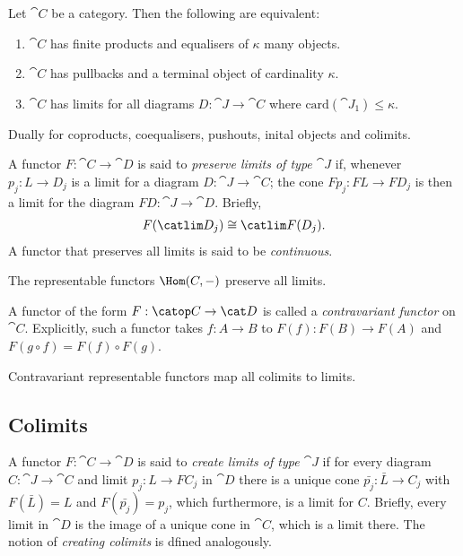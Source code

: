 \documentclass{article}
\begin{document}
\begin{proposition}[Awodey p. 105]
    Let $\cat C$ be a category. Then the following are equivalent:
    \begin{enumerate}
        \item $\cat C$ has finite products and equalisers of $\kappa$ many objects.
        \item $\cat C$ has pullbacks and a terminal object of cardinality $\kappa$.
        \item $\cat C$ has limits for all diagrams $D:\cat J\to\cat C$ where $\text{card}(\cat J_1)\leq \kappa$.
    \end{enumerate}
    Dually for coproducts, coequalisers, pushouts, inital objects and colimits.
\end{proposition}

\begin{definition}[Awodey p. 106]
    A functor $F:\cat C\to\cat D$ is said to \emph{preserve limits of type $\cat J$} if,
    whenever $p_j:L\to D_j$ is a limit for a diagram $D:\cat J\to\cat C$; the cone
    $Fp_j:FL\to FD_j$ is then a limit for the diagram $FD:\cat J\to\cat D$. Briefly,
    \begin{align*}
        F(\catlim D_j)\cong \catlim F(D_j).
    \end{align*}
    A functor that preserves all limits is said to be \emph{continuous}.
\end{definition}

\begin{proposition}
    The representable functors $\Hom(C,-)$ preserve all limits.
\end{proposition}

\begin{definition}[Awodey p. 107]
    A functor of the form $F:\catop C\to \cat D$ is called a \emph{contravariant
        functor} on $\cat C$. Explicitly, such a functor takes $f:A\to B$ to $F(f):
        F(B)\to F(A)$ and $F(g\circ f)=F(f)\circ F(g)$.
\end{definition}

\begin{corollary}
    Contravariant representable functors map all colimits to limits.
\end{corollary}

\subsection{Colimits}

\begin{definition}[Awodey p. 110]
    A functor $F:\cat C\to\cat D$ is said to \emph{create limits of type $\cat J$}
    if for every diagram $C:\cat J\to\cat C$ and limit $p_j:L\to FC_j$ in $\cat D$
    there is a unique cone $\bar{p_j}:\bar L \to C_j$ with $F(\bar L) = L$ and
    $F(\bar{p_j})=p_j$, which furthermore, is a limit for $C$. Briefly, every limit
    in $\cat D$ is the image of a unique cone in $\cat C$, which is a limit there.
    The notion of \emph{creating colimits} is dfined analogously.
\end{definition}
\end{document}
